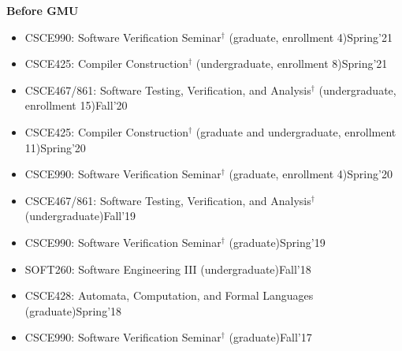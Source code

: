\documentclass[11pt]{article}
\newcommand{\beforegmu}{\textbf{Before GMU}}
\begin{document}
{\begin{itemize}
  \end{itemize}

  \vspace{0.1in}
  \beforegmu{}
  \vspace{0.1in}

  \begin{itemize}
  \item CSCE990: Software Verification Seminar$^{\dagger}$ (graduate, enrollment 4)\hfill Spring'21    
  \item CSCE425: Compiler Construction$^{\dagger}$ (undergraduate, enrollment 8)\hfill Spring'21
    \item CSCE467/861: Software Testing, Verification, and Analysis$^{\dagger}$ (undergraduate, enrollment 15)\hfill Fall'20
  \item CSCE425: Compiler Construction$^{\dagger}$ (graduate and undergraduate, enrollment 11)\hfill Spring'20
    \item CSCE990: Software Verification Seminar$^{\dagger}$ (graduate, enrollment 4)\hfill Spring'20
  \item CSCE467/861: Software Testing, Verification, and Analysis$^{\dagger}$ (undergraduate)\hfill Fall'19
  \item CSCE990: Software Verification Seminar$^{\dagger}$ (graduate)\hfill Spring'19
  \item SOFT260: Software Engineering III (undergraduate)\hfill Fall'18
  \item CSCE428: Automata, Computation, and Formal Languages (graduate)\hfill Spring'18
  \item CSCE990: Software Verification Seminar$^{\dagger}$ (graduate)\hfill Fall'17

\end{itemize}}
\end{document}

